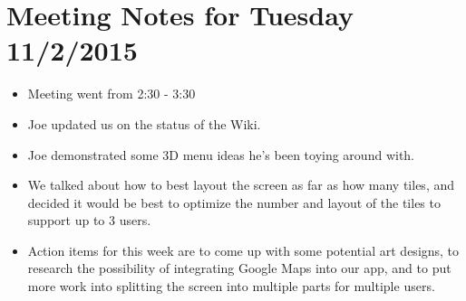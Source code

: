 \documentclass[]{article}
\begin{document}
\section{Meeting Notes for Tuesday 11/2/2015}
	\begin{itemize}
		\item Meeting went from 2:30 - 3:30
		\item Joe updated us on the status of the Wiki. 
		\item Joe demonstrated some 3D menu ideas he's been toying around with. 
		\item We talked about how to best layout the screen as far as how many tiles, and decided it would be best to optimize the number and layout of the tiles to support up to 3 users. 
		\item Action items for this week are to come up with some potential art designs, to research the possibility of integrating Google Maps into our app, and to put more work into splitting the screen into multiple parts for multiple users. 


\end{itemize}
\end{document}

